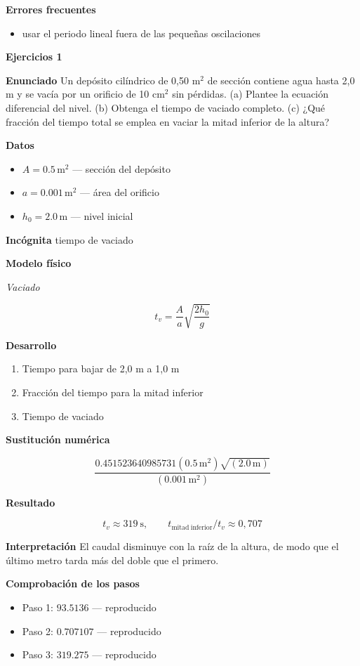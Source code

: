 \documentclass[10pt,openany]{book}
\begin{document}
\noindent\textbf{Errores frecuentes}
\begin{itemize}
\item usar el periodo lineal fuera de las pequeñas oscilaciones
\end{itemize}

\noindent\textbf{Ejercicios 1}

\noindent\textbf{Enunciado}
Un depósito cilíndrico de 0,50 m\(^2\) de sección contiene agua hasta 2,0 m y se vacía por un orificio de 10 cm\(^2\) sin pérdidas. (a) Plantee la ecuación diferencial del nivel. (b) Obtenga el tiempo de vaciado completo. (c) ¿Qué fracción del tiempo total se emplea en vaciar la mitad inferior de la altura?

\noindent\textbf{Datos}
\begin{itemize}
\item $A = 0.5\,\mathrm{m}^{2}$ — sección del depósito
\item $a = 0.001\,\mathrm{m}^{2}$ — área del orificio
\item $h_{0} = 2.0\,\mathrm{m}$ — nivel inicial
\end{itemize}

\noindent\textbf{Incógnita}
tiempo de vaciado

\noindent\textbf{Modelo físico}

\noindent\textit{Vaciado}

\[
t_v = \frac{A}{a}\sqrt{\frac{2h_0}{g}}
\]

\noindent\textbf{Desarrollo}
\begin{enumerate}
\item
Tiempo para bajar de 2,0 m a 1,0 m
\item
Fracción del tiempo para la mitad inferior
\item
Tiempo de vaciado
\end{enumerate}

\noindent\textbf{Sustitución numérica}

\[
\frac{0.451523640985731 \left(0.5\,\mathrm{m}^{2}\right) \sqrt{\left(2.0\,\mathrm{m}\right)}}{\left(0.001\,\mathrm{m}^{2}\right)}
\]

\noindent\textbf{Resultado}

\[
t_v \approx 319\ \mathrm{s},\qquad t_{\mathrm{mitad\ inferior}}/t_v \approx 0{,}707
\]

\noindent\textbf{Interpretación}
El caudal disminuye con la raíz de la altura, de modo que el último metro tarda más del doble que el primero.

\noindent\textbf{Comprobación de los pasos}
\begin{itemize}
\item Paso 1: $93.5136$ — reproducido
\item Paso 2: $0.707107$ — reproducido
\item Paso 3: $319.275$ — reproducido
\end{itemize}
\end{document}
